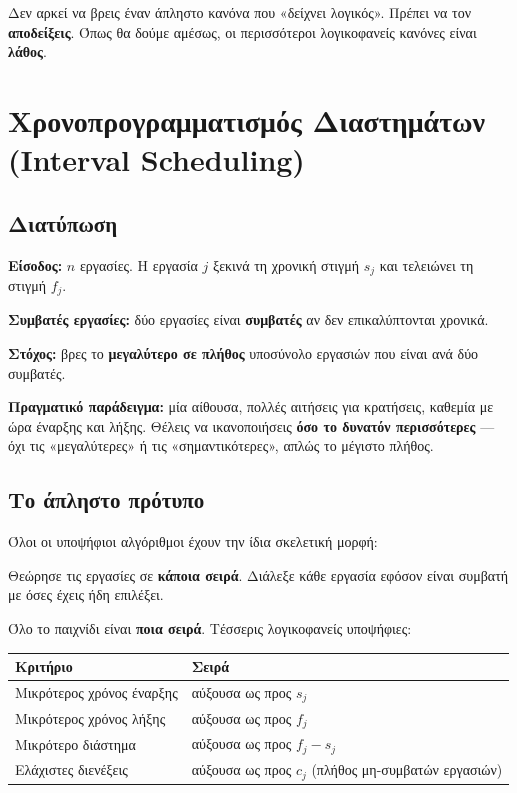\documentclass[11pt,a4paper]{article}
\begin{document}
Δεν αρκεί να βρεις έναν άπληστο κανόνα που «δείχνει λογικός». Πρέπει να τον
\textbf{αποδείξεις}. Όπως θα δούμε αμέσως, οι περισσότεροι λογικοφανείς κανόνες
είναι \textbf{λάθος}.

\section{Χρονοπρογραμματισμός Διαστημάτων (Interval Scheduling)}

\subsection{Διατύπωση}

\textbf{Είσοδος:} $n$ εργασίες. Η εργασία $j$ ξεκινά τη χρονική στιγμή $s_j$ και
τελειώνει τη στιγμή $f_j$.

\textbf{Συμβατές εργασίες:} δύο εργασίες είναι \textbf{συμβατές} αν δεν
επικαλύπτονται χρονικά.

\textbf{Στόχος:} βρες το \textbf{μεγαλύτερο σε πλήθος} υποσύνολο εργασιών που
είναι ανά δύο συμβατές.

\begin{intuition}
\textbf{Πραγματικό παράδειγμα:} μία αίθουσα, πολλές αιτήσεις για κρατήσεις,
καθεμία με ώρα έναρξης και λήξης. Θέλεις να ικανοποιήσεις \textbf{όσο το δυνατόν
περισσότερες} --- όχι τις «μεγαλύτερες» ή τις «σημαντικότερες», απλώς το μέγιστο
πλήθος.
\end{intuition}

\subsection{Το άπληστο πρότυπο}

Όλοι οι υποψήφιοι αλγόριθμοι έχουν την ίδια σκελετική μορφή:

\begin{quoteblock}
Θεώρησε τις εργασίες σε \textbf{κάποια σειρά}. Διάλεξε κάθε εργασία εφόσον είναι
συμβατή με όσες έχεις ήδη επιλέξει.
\end{quoteblock}

Όλο το παιχνίδι είναι \textbf{ποια σειρά}. Τέσσερις λογικοφανείς υποψήφιες:

\begin{center}
\begin{tabular}{@{}l l@{}}
\toprule
Κριτήριο & Σειρά \\
\midrule
Μικρότερος χρόνος έναρξης & αύξουσα ως προς $s_j$ \\
Μικρότερος χρόνος λήξης   & αύξουσα ως προς $f_j$ \\
Μικρότερο διάστημα        & αύξουσα ως προς $f_j - s_j$ \\
Ελάχιστες διενέξεις       & αύξουσα ως προς $c_j$ (πλήθος μη-συμβατών εργασιών) \\
\bottomrule
\end{tabular}
\end{center}
\end{document}
